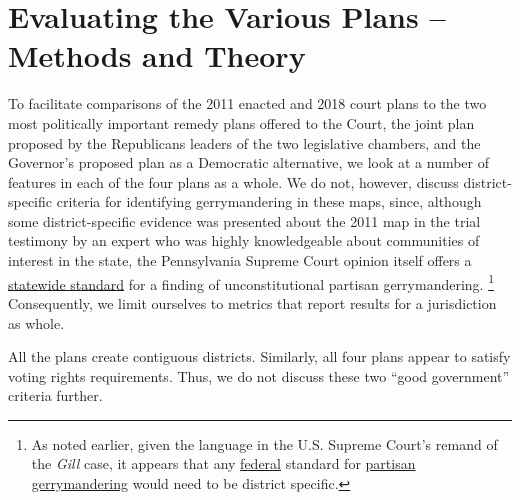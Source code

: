 \par
    \section{Evaluating the Various Plans -- Methods and Theory}
    To facilitate comparisons of the 2011 enacted and 2018 court plans to the two most politically important remedy plans offered to the Court, the joint plan proposed by the Republicans leaders of the two legislative chambers, and the Governor’s proposed plan as a Democratic alternative, we look at a number of features in each of the four plans as a whole. We do not, however, discuss district-specific criteria for identifying gerrymandering in these maps, since, although some district-specific evidence was presented about the 2011 map in the trial testimony by an expert who was highly knowledgeable about communities of interest in the state, the Pennsylvania Supreme Court opinion itself offers a \underline{statewide standard} for a finding of unconstitutional partisan gerrymandering. 
        \footnote{As noted earlier, given the language in the U.S. Supreme Court’s remand of the \textit{Gill} case, it appears that any \underline{federal} standard for \underline{partisan gerrymandering} would need to be district specific.}
    Consequently, we limit ourselves to metrics that report results for a jurisdiction as whole.
\par
    All the plans create contiguous districts. Similarly, all four plans appear to satisfy voting rights requirements. Thus, we do not discuss these two ``good government'' criteria further.
\par
